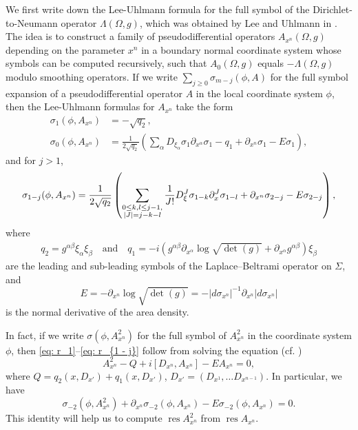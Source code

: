 \documentclass[11pt]{amsart}
\newcommand*{\res}{\operatorname{res}}
\theoremstyle{definition}
\numberwithin{equation}{section}
\begin{document}
We first write down the Lee-Uhlmann formula for the full symbol of the Dirichlet-to-Neumann operator $\Lambda(\Omega,g)$, which was obtained by Lee and Uhlmann in \cite[Proposition 1.1]{leeDeterminingAnisotropicReal1989}. The idea is to construct a family of pseudodifferential operators $A_{x^n}(\Omega,g)$ depending on the parameter $x^n$ in a boundary normal coordinate system whose symbols can be computed recursively,  such that $A_0(\Omega,g)$ equals $-\Lambda(\Omega,g)$ modulo smoothing operators.  
If we write $\sum_{j\ge 0}\sigma_{m-j}(\phi,A)$ for the full symbol expansion of a pseudodifferential operator $A$ in the local coordinate system $\phi$, then the Lee-Uhlmann formulas for $A_{x^n}$ take the form 
\begin{align}
        \label{eq: r_1}
        \sigma_{1}(\phi,A_{x^n}) & = - \sqrt{q_2},\\
        \label{eq: r_0}
        \sigma_{0}(\phi,A_{x^n}) & = \frac{1}{2\sqrt{q_2}}\left(\sum_\alpha D_{\xi_\alpha} \sigma_{1}\partial_{x^\alpha} \sigma_{1} - q_1 + \partial_{x^n} \sigma_{1} - E \sigma_{1}\right),
\end{align}
and for $j > 1$,
\begin{equation}\label{eq: r_{1 - j}}
    \sigma_{1-j}(\phi,A_{x^n}) = \frac{1}{2\sqrt{q_2}}\left(\sum_{\substack{0\le k,l\le j-1,\\|J| = j-k-l}}\frac{1}{J!}D_\xi^J\sigma_{1-k} \partial_x^J \sigma_{1-l} + \partial_{x^n} \sigma_{2-j} - E\sigma_{2-j}\right),
\end{equation}
where
\begin{align*}
    q_2   = g^{\alpha\beta}\xi_\alpha\xi_\beta \quad \text{and} \quad 
    q_1   = - i\left(g^{\alpha\beta}\partial_{x^\alpha}\log \sqrt{\det(g)} + \partial_{x^\alpha}g^{\alpha\beta}\right)\xi_\beta 
\end{align*}
are the leading  and sub-leading symbols of the Laplace--Beltrami operator on $\Sigma$, and 
\[E = -\partial_{x^n}\log \sqrt{\det(g)} = -|d\sigma_{x^n}|^{-1}\partial_{x^n}|d\sigma_{x^n}|\]
is the normal derivative of the area density.

In fact, if we write $\sigma(\phi,A_{x^n}^2)$ for the full symbol of  $A_{x^n}^2$ in the coordinate system $\phi$, then \eqref{eq: r_1}--\eqref{eq: r_{1 - j}} follow from solving the equation (cf. \cite[(1.5)]{leeDeterminingAnisotropicReal1989}) 
\begin{equation}
	\label{operatordecomp}
	A_{x^n}^2 - Q + i[D_{x^n},A_{x^n}] - EA_{x^n} = 0,
\end{equation}
where $Q = q_2(x,D_{x'}) + q_1(x,D_{x'})$, $D_{x'} = (D_{x^1},\dots D_{x^{n-1}})$. In particular, we have
\begin{equation}\label{eq: sigma A^2 and sigma A}
    \sigma_{-2}(\phi,A_{x^n}^2) + \partial_{x^n}\sigma_{-2}(\phi,A_{x^n})-E\sigma_{-2}(\phi,A_{x^n}) = 0.
\end{equation}
This identity will help us to compute $\res A_{x^n}^2$ from $\res A_{x^n}$.
\end{document}
